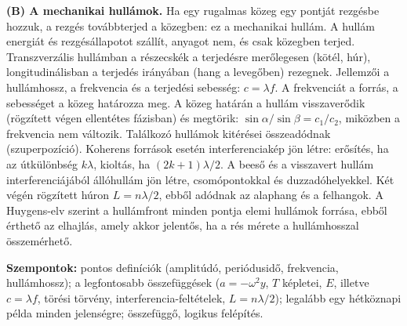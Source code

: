 \documentclass[11pt,a4paper]{article}
\begin{document}
\begin{enumerate}
  \textbf{(B) A mechanikai hullámok.} Ha egy rugalmas közeg egy pontját rezgésbe hozzuk, a
  rezgés továbbterjed a közegben: ez a mechanikai hullám. A hullám energiát és
  rezgésállapotot szállít, anyagot nem, és csak közegben terjed. Transzverzális hullámban a
  részecskék a terjedésre merőlegesen (kötél, húr), longitudinálisban a terjedés irányában
  (hang a levegőben) rezegnek. Jellemzői a hullámhossz, a frekvencia és a terjedési
  sebesség: $c = \lambda f$. A frekvenciát a forrás, a sebességet a közeg határozza meg. A
  közeg határán a hullám visszaverődik (rögzített végen ellentétes fázisban) és megtörik:
  $\sin\alpha/\sin\beta = c_1/c_2$, miközben a frekvencia nem változik. Találkozó hullámok
  kitérései összeadódnak (szuperpozíció). Koherens források esetén interferenciakép jön
  létre: erősítés, ha az útkülönbség $k\lambda$, kioltás, ha $(2k+1)\lambda/2$. A beeső és
  a visszavert hullám interferenciájából állóhullám jön létre, csomópontokkal és
  duzzadóhelyekkel. Két végén rögzített húron $L = n\lambda/2$, ebből adódnak az alaphang és a
  felhangok. A Huygens-elv szerint a hullámfront minden pontja elemi hullámok forrása, ebből
  érthető az elhajlás, amely akkor jelentős, ha a rés mérete a hullámhosszal összemérhető.

  \medskip
  \textbf{Szempontok:} pontos definíciók (amplitúdó, periódusidő, frekvencia,
  hullámhossz); a legfontosabb összefüggések ($a = -\omega^2y$, $T$ képletei, $E$, illetve
  $c = \lambda f$, törési törvény, interferencia-feltételek, $L = n\lambda/2$); legalább egy
  hétköznapi példa minden jelenségre; összefüggő, logikus felépítés.
\end{enumerate}
\end{document}
